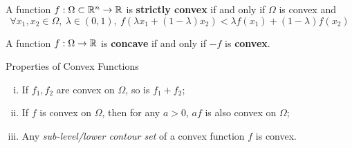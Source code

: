 \documentclass{article}
\begin{document}
    \begin{definition}
        A function $f: \Omega \subset \mathbb{R}^n \to \mathbb{R}$ is \textbf{strictly convex} if and only if $\Omega$ is convex and 
        \begin{equation}
            \forall x_1, x_2 \in \Omega,\ \lambda \in (0, 1),\ f\left(\lambda x_1 + (1- \lambda) x_2 \right) < \lambda f(x_1) + (1 - \lambda) f(x_2)
        \end{equation}
    \end{definition}
    
    \begin{definition}
        A function $f: \Omega \to \mathbb{R}$ is \textbf{concave} if and only if $-f$ is \textbf{convex}.
    \end{definition}
    
    \begin{proposition}Properties of Convex Functions
        \begin{enumerate}[(i)]
            \item If $f_1, f_2$ are convex on $\Omega$, so is $f_1 + f_2$;
            \item If $f$ is convex on $\Omega$, then for any $a > 0$, $af$ is also convex on $\Omega$;
            \item Any \emph{sub-level/lower contour set} of a convex function $f$ is convex.
        \end{enumerate}
    \end{proposition}
    
\end{document}

